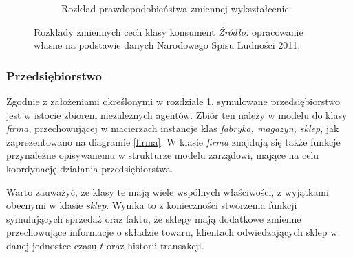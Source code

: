 \documentclass[polish, twoside, 12pt, a4paper]{article}
\theoremstyle{definition}
\theoremstyle{plain}
\theoremstyle{remark}
\begin{document}
\begin{figure}[hbt]
\begin{subfigure}[t]{0.45\textwidth}
    \caption{Rozkład prawdopodobieństwa zmiennej wykształcenie}
    \label{fig:wyksztalcenie}
  \end{subfigure}
  \captionsetup{margin=10pt,font=small,labelfont=bf,width=.8\textwidth}
  \caption[Rozkłady zmiennych cech klasy konsument]{Rozkłady zmiennych cech klasy konsument \textit{Źródło:} opracowanie własne na podstawie danych Narodowego Spisu Ludności 2011, \cite{GUS2011}}\label{fig:wyksztalcenie}
\end{figure}


\subsubsection{Przedsiębiorstwo}

Zgodnie z założeniami określonymi w rozdziale 1, symulowane przedsiębiorstwo jest w istocie zbiorem niezależnych agentów. Zbiór ten należy w modelu do klasy \textit{firma}, przechowującej w macierzach instancje klas \textit{fabryka, magazyn, sklep}, jak zaprezentowano na diagramie \ref{firma}. W klasie \textit{firma} znajdują się także funkcje przynależne opisywanemu w strukturze modelu zarządowi, mające na celu koordynację działania przedsiębiorstwa. 

Warto zauważyć, że klasy te mają wiele wspólnych właściwości, z wyjątkami obecnymi w klasie \textit{sklep}. Wynika to z konieczności stworzenia funkcji symulujących sprzedaż oraz faktu, że sklepy mają dodatkowe zmienne przechowujące informacje o składzie towaru, klientach odwiedzających sklep w danej jednostce czasu $t$ oraz historii transakcji.  
\end{document}
